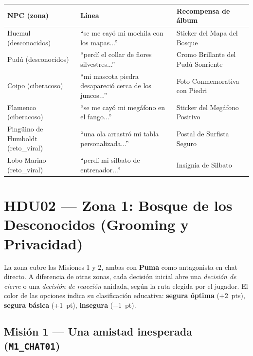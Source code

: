 \documentclass[12pt,a4paper]{article}
\begin{document}
\begin{center}
\begin{tabular}{@{}lll@{}}
\toprule
\textbf{NPC (zona)} & \textbf{Línea} & \textbf{Recompensa de álbum} \\
\midrule
Huemul (desconocidos) & ``se me cayó mi mochila con los mapas...'' & Sticker del Mapa del Bosque \\
Pudú (desconocidos) & ``perdí el collar de flores silvestres...'' & Cromo Brillante del Pudú Sonriente \\
Coipo (ciberacoso) & ``mi mascota piedra desapareció cerca de los juncos...'' & Foto Conmemorativa con Piedri \\
Flamenco (ciberacoso) & ``se me cayó mi megáfono en el fango...'' & Sticker del Megáfono Positivo \\
Pingüino de Humboldt (reto\_viral) & ``una ola arrastró mi tabla personalizada...'' & Postal de Surfista Seguro \\
Lobo Marino (reto\_viral) & ``perdí mi silbato de entrenador...'' & Insignia de Silbato \\
\bottomrule
\end{tabular}
\end{center}

\newpage
\section{HDU02 --- Zona 1: Bosque de los Desconocidos (Grooming y Privacidad)}

La zona cubre las Misiones 1 y 2, ambas con \textbf{Puma} como antagonista en chat directo.
A diferencia de otras zonas, cada decisión inicial abre una \emph{decisión de cierre} o una
\emph{decisión de reacción} anidada, según la ruta elegida por el jugador.
El color de las opciones indica su clasificación educativa:
{\color{segura}\textbf{segura óptima}} (+2~pts),
{\color{basica}\textbf{segura básica}} (+1~pt),
{\color{insegura}\textbf{insegura}} ($-$1~pt).

\subsection{Misión 1 --- Una amistad inesperada (\texttt{M1\_CHAT01})}
\end{document}
